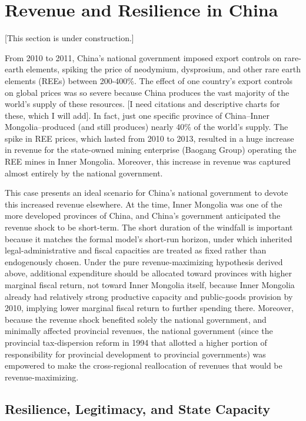 \documentclass[12pt]{article}
\begin{document}
\section{Revenue and Resilience in China}

[This section is under construction.]


From 2010 to 2011, China's national government imposed export controls on rare-earth elements, spiking the price of neodymium, dysprosium, and other rare earth elements (REEs) between 200-400\%. The effect of one country's export controls on global prices was so severe because China produces the vast majority of the world's supply of these resources. [I need citations and descriptive charts for these, which I will add]. In fact, just one specific province of China--Inner Mongolia--produced (and still produces) nearly 40\% of the world's supply. The spike in REE prices, which lasted from 2010 to 2013, resulted in a huge increase in revenue for the state-owned mining enterprise (Baogang Group) operating the REE mines in Inner Mongolia. Moreover, this increase in revenue was captured almost entirely by the national government.

This case presents an ideal scenario for China's national government to devote this increased revenue elsewhere. At the time, Inner Mongolia was one of the more developed provinces of China, and China's government anticipated the revenue shock to be short-term. The short duration of the windfall is important because it matches the formal model's short-run horizon, under which inherited legal-administrative and fiscal capacities are treated as fixed rather than endogenously chosen. Under the pure revenue-maximizing hypothesis derived above, additional expenditure should be allocated toward provinces with higher marginal fiscal return, not toward Inner Mongolia itself, because Inner Mongolia already had relatively strong productive capacity and public-goods provision by 2010, implying lower marginal fiscal return to further spending there. Moreover, because the revenue shock benefited solely the national government, and minimally affected provincial revenues, the national government (since the provincial tax-dispersion reform in 1994 that allotted a higher portion of responsibility for provincial development to provincial governments) was empowered to make the cross-regional reallocation of revenues that would be revenue-maximizing.

\subsection{Resilience, Legitimacy, and State Capacity}
\end{document}
